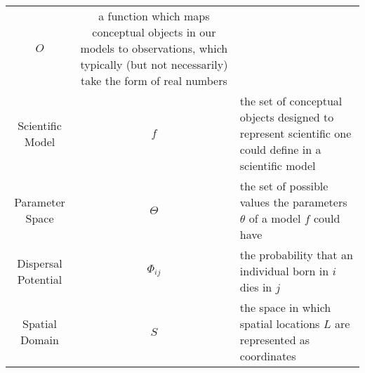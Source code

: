 \documentclass[]{article}
\begin{document}
\begin{longtable}[]{@{}ccl@{}}
\begin{minipage}[t]{0.23\columnwidth}
\(O\)\strut
\end{minipage} & \begin{minipage}[t]{0.42\columnwidth}\raggedright
a function which maps conceptual objects in our models to observations,
which typically (but not necessarily) take the form of real
numbers\strut
\end{minipage}\tabularnewline
\begin{minipage}[t]{0.25\columnwidth}\centering
Scientific Model\strut
\end{minipage} & \begin{minipage}[t]{0.23\columnwidth}\centering
\(f\)\strut
\end{minipage} & \begin{minipage}[t]{0.42\columnwidth}\raggedright
the set of conceptual objects designed to represent scientific one could
define in a scientific model\strut
\end{minipage}\tabularnewline
\begin{minipage}[t]{0.25\columnwidth}\centering
Parameter Space\strut
\end{minipage} & \begin{minipage}[t]{0.23\columnwidth}\centering
\(\Theta\)\strut
\end{minipage} & \begin{minipage}[t]{0.42\columnwidth}\raggedright
the set of possible values the parameters \(\theta\) of a model \(f\)
could have\strut
\end{minipage}\tabularnewline
\begin{minipage}[t]{0.25\columnwidth}\centering
Dispersal Potential\strut
\end{minipage} & \begin{minipage}[t]{0.23\columnwidth}\centering
\(\Phi_{ij}\)\strut
\end{minipage} & \begin{minipage}[t]{0.42\columnwidth}\raggedright
the probability that an individual born in \(i\) dies in \(j\)\strut
\end{minipage}\tabularnewline
\begin{minipage}[t]{0.25\columnwidth}\centering
Spatial Domain\strut
\end{minipage} & \begin{minipage}[t]{0.23\columnwidth}\centering
\(S\)\strut
\end{minipage} & \begin{minipage}[t]{0.42\columnwidth}\raggedright
the space in which spatial locations \(L\) are represented as
coordinates\strut

\end{minipage}
\end{longtable}
\end{document}
